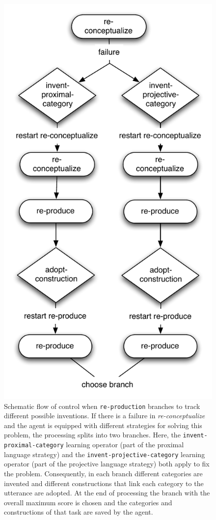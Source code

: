 \begin{figure} 
\begin{center}
\includegraphics[width=0.5\columnwidth]{figs/re-production-branching}
\end{center}
\caption[Schematic flow of control when {\footnotesize\tt re-production} branches]{%
Schematic flow of control when {\footnotesize\tt re-production} branches to track
different possible inventions. If there is a failure in \emph{re-conceptualize} and
the agent is equipped with different strategies for solving this problem, the processing
splits into two branches. Here, the {\footnotesize\tt invent-proximal-category} learning operator
(part of the proximal language strategy) and the 
{\footnotesize\tt invent-projective-category} learning operator 
(part of the projective language strategy) both apply to 
fix the problem. Consequently, in each branch different
categories are invented and different constructions that 
link each category to the utterance are adopted.
At the end of processing the branch with the overall 
maximum score is chosen and the categories
and constructions of that task are saved by the agent.}
\label{f:re-production-branching}
\end{figure}


